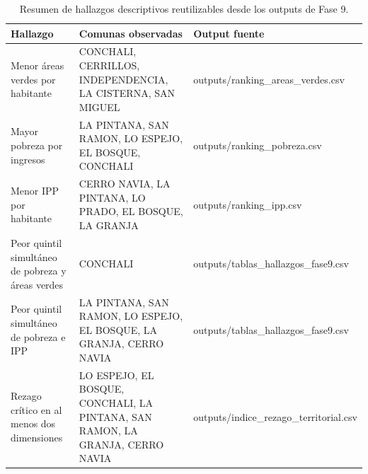 \begin{table}[htbp]
\centering
\footnotesize
\caption{Resumen de hallazgos descriptivos reutilizables desde los outputs de Fase 9.}
\begin{tabular}{|p{4.3cm}|p{7.0cm}|p{3.0cm}|}
\hline
Hallazgo & Comunas observadas & Output fuente \\
\hline
Menor áreas verdes por habitante & CONCHALI, CERRILLOS, INDEPENDENCIA, LA CISTERNA, SAN MIGUEL & outputs/ranking\_areas\_verdes.csv \\
Mayor pobreza por ingresos & LA PINTANA, SAN RAMON, LO ESPEJO, EL BOSQUE, CONCHALI & outputs/ranking\_pobreza.csv \\
Menor IPP por habitante & CERRO NAVIA, LA PINTANA, LO PRADO, EL BOSQUE, LA GRANJA & outputs/ranking\_ipp.csv \\
Peor quintil simultáneo de pobreza y áreas verdes & CONCHALI & outputs/tablas\_hallazgos\_fase9.csv \\
Peor quintil simultáneo de pobreza e IPP & LA PINTANA, SAN RAMON, LO ESPEJO, EL BOSQUE, LA GRANJA, CERRO NAVIA & outputs/tablas\_hallazgos\_fase9.csv \\
Rezago crítico en al menos dos dimensiones & LO ESPEJO, EL BOSQUE, CONCHALI, LA PINTANA, SAN RAMON, LA GRANJA, CERRO NAVIA & outputs/indice\_rezago\_territorial.csv \\
\hline
\end{tabular}
\end{table}
